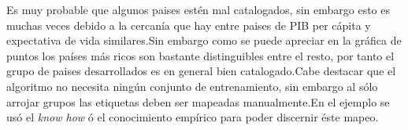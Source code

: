 \documentclass{article}
\begin{document}
Es muy probable que algunos paises estén mal catalogados, sin embargo esto es muchas veces debido a la cercanía que hay entre paises de PIB per cápita y expectativa de vida similares.Sin embargo como se puede apreciar en la gráfica de puntos los países más ricos son bastante distinguibles entre el resto, por tanto el grupo de paises desarrollados es en general bien catalogado.Cabe destacar que el algoritmo no necesita ningún conjunto de entrenamiento, sin embargo al sólo arrojar grupos las etiquetas deben ser mapeadas manualmente.En el ejemplo se usó el \textit{know how} ó el conocimiento empírico para poder discernir éste mapeo.
\end{document}
